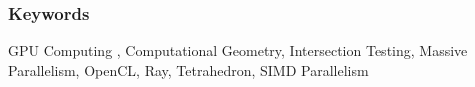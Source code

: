 \subsubsection*{Keywords}

\noindent \begin{english}GPU Computing , Computational Geometry, Intersection Testing, Massive Parallelism, OpenCL, Ray, Tetrahedron, SIMD Parallelism\end{english} 

